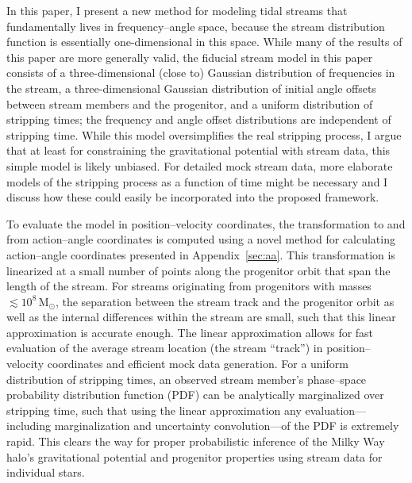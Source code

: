 \documentclass{emulateapj}
\newcommand{\msun}{\ensuremath{\,\mathrm{M}_{\odot}}}
\begin{document}
In this paper, I present a new method for modeling tidal streams that
fundamentally lives in frequency--angle space, because the stream
distribution function is essentially one-dimensional in this
space. While many of the results of this paper are more generally
valid, the fiducial stream model in this paper consists of a
three-dimensional (close to) Gaussian distribution of frequencies in
the stream, a three-dimensional Gaussian distribution of initial angle
offsets between stream members and the progenitor, and a uniform
distribution of stripping times; the frequency and angle offset
distributions are independent of stripping time. While this model
oversimplifies the real stripping process, I argue that at least for
constraining the gravitational potential with stream data, this simple
model is likely unbiased. For detailed mock stream data, more
elaborate models of the stripping process as a function of time might
be necessary and I discuss how these could easily be incorporated into
the proposed framework.

To evaluate the model in position--velocity coordinates, the
transformation to and from action--angle coordinates is computed using
a novel method for calculating action--angle coordinates presented in
Appendix~\ref{sec:aa}. This transformation is linearized at a small
number of points along the progenitor orbit that span the length of
the stream. For streams originating from progenitors with masses
$\lesssim 10^8\msun$, the separation between the stream track and the
progenitor orbit as well as the internal differences within the stream
are small, such that this linear approximation is accurate enough. The
linear approximation allows for fast evaluation of the average stream
location (the stream ``track'') in position--velocity coordinates and
efficient mock data generation. For a uniform distribution of
stripping times, an observed stream member's phase--space probability
distribution function (PDF) can be analytically marginalized over
stripping time, such that using the linear approximation any
evaluation---including marginalization and uncertainty
convolution---of the PDF is extremely rapid. This clears the way for
proper probabilistic inference of the Milky Way halo's gravitational
potential and progenitor properties using stream data for individual
stars.
\end{document}
